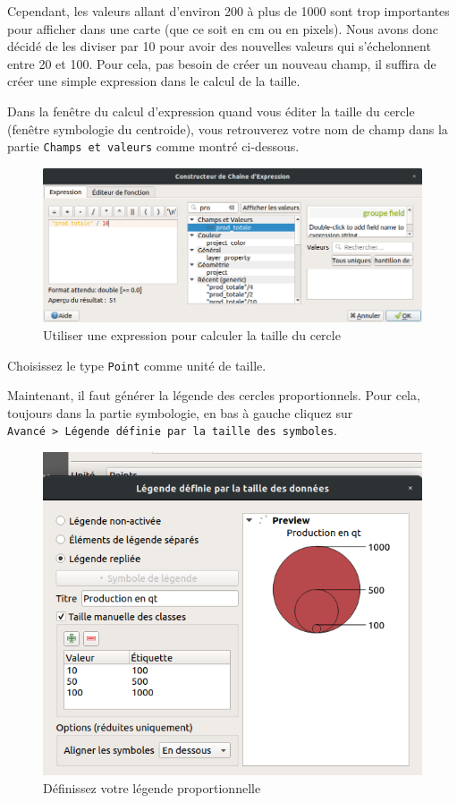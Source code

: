 Cependant, les valeurs allant d'environ 200 à plus de 1000 sont trop
importantes pour afficher dans une carte (que ce soit en cm ou en
pixels). Nous avons donc décidé de les diviser par 10 pour avoir des
nouvelles valeurs qui s'échelonnent entre 20 et 100. Pour cela, pas
besoin de créer un nouveau champ, il suffira de créer une simple
expression dans le calcul de la taille.

Dans la fenêtre du calcul d'expression quand vous éditer la taille du
cercle (fenêtre symbologie du centroide), vous retrouverez votre nom de
champ dans la partie \texttt{Champs\ et\ valeurs} comme montré
ci-dessous.

\begin{figure}
\centering
\includegraphics{figures/division_taille_champ.png}
\caption{Utiliser une expression pour calculer la taille du cercle}
\end{figure}

Choisissez le type \texttt{Point} comme unité de taille.

Maintenant, il faut générer la légende des cercles proportionnels. Pour
cela, toujours dans la partie symbologie, en bas à gauche cliquez sur
\texttt{Avancé\ \textgreater{}\ Légende\ définie\ par\ la\ taille\ des\ symboles}.

\begin{figure}
\centering
\includegraphics{figures/legend_propor.png}
\caption{Définissez votre légende proportionnelle}
\end{figure}

